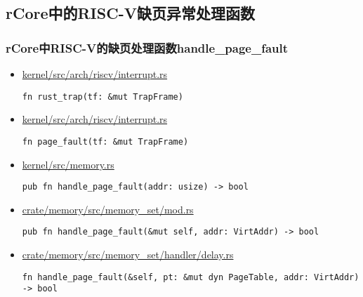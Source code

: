 \subsection{rCore中的RISC-V缺页异常处理函数}
\begin{frame}   
	\frametitle{rCore中RISC-V的缺页处理函数handle\_page\_fault}
    \begin{itemize}
        \item \href{https://github.com/rcore-os/rCore/blob/cd81f4cc73ea3302ed0356398525b0b56c4fca92/kernel/src/arch/riscv/interrupt.rs#L56}{kernel/src/arch/riscv/interrupt.rs}
\begin{verbatim}
fn rust_trap(tf: &mut TrapFrame)
\end{verbatim} \pause
        \item \href{https://github.com/rcore-os/rCore/blob/cd81f4cc73ea3302ed0356398525b0b56c4fca92/kernel/src/arch/riscv/interrupt.rs#L125}{kernel/src/arch/riscv/interrupt.rs}
\begin{verbatim}
fn page_fault(tf: &mut TrapFrame)
\end{verbatim} \pause
        \item \href{https://github.com/rcore-os/rCore/blob/cd81f4cc73ea3302ed0356398525b0b56c4fca92/kernel/src/memory.rs\#L132}{kernel/src/memory.rs}
\begin{verbatim}
pub fn handle_page_fault(addr: usize) -> bool
\end{verbatim} \pause
        \item \href{https://github.com/rcore-os/rCore/blob/master/crate/memory/src/memory_set/mod.rs#L379}{crate/memory/src/memory\_set/mod.rs}
\begin{verbatim}
pub fn handle_page_fault(&mut self, addr: VirtAddr) -> bool
\end{verbatim}
\pause
        \item \href{https://github.com/rcore-os/rCore/blob/master/crate/memory/src/memory_set/handler/delay.rs#L52}{crate/memory/src/memory\_set/handler/delay.rs}
\begin{verbatim}
fn handle_page_fault(&self, pt: &mut dyn PageTable, addr: VirtAddr) -> bool
\end{verbatim}
    \end{itemize}
\end{frame}
% 
% 
% 
% 
